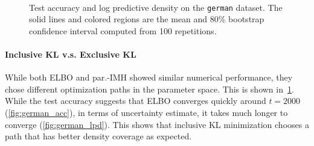\begin{figure}[H]
  \vspace{-0.05in}
  \centering
    \\
    \vspace{-0.05in}
  \caption{Test accuracy and log predictive density on the \texttt{german} dataset.
    The solid lines and colored regions are the mean and 80\% bootstrap confidence interval computed from 100 repetitions.
  }\label{fig:logistic}
  \vspace{-0.05in}
\end{figure}
%
  \vspace{-0.1in}
\paragraph{Inclusive KL v.s. Exclusive KL}
While both ELBO and par.-IMH showed similar numerical performance, they chose different optimization paths in the parameter space.
This is shown in~\cref{fig:logistic}.
While the test accuracy suggests that ELBO converges quickly around \(t=2000\) (\cref{fig:german_acc}), in terms of uncertainty estimate, it takes much longer to converge (\cref{fig:german_lpd}).
This shows that inclusive KL minimization chooses a path that has better density coverage as expected.

